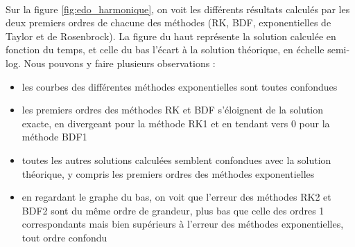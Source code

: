         \paragraph{}
        Sur la figure \ref{fig:edo_harmonique}, on voit les différents résultats calculés par les deux premiers ordres de chacune des méthodes (RK, BDF, exponentielles de Taylor et de Rosenbrock). La figure du haut représente la solution calculée en fonction du temps, et celle du bas l'écart à la solution théorique, en échelle semi-log. Nous pouvons y faire plusieurs observations :
        \begin{itemize}
            \item les courbes des différentes méthodes exponentielles sont toutes confondues
            \item les premiers ordres des méthodes RK et BDF s'éloignent de la solution exacte, en divergeant pour la méthode RK1 et en tendant vers 0 pour la méthode BDF1
            \item toutes les autres solutions calculées semblent confondues avec la solution théorique, y compris les premiers ordres des méthodes exponentielles
            \item en regardant le graphe du bas, on voit que l'erreur des méthodes RK2 et BDF2 sont du même ordre de grandeur, plus bas que celle des ordres 1 correspondants mais bien supérieurs à l'erreur des méthodes exponentielles, tout ordre confondu
        \end{itemize}

